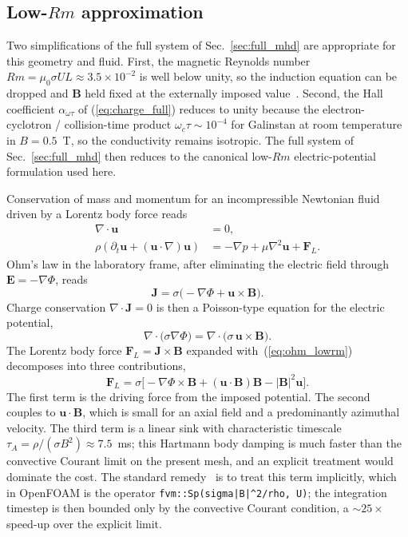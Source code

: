 \documentclass[aps,prl,twocolumn,superscriptaddress]{revtex4-2}
\begin{document}
\subsection{Low-$Rm$ approximation}
\label{sec:lowrm}

Two simplifications of the full system of
Sec.~\ref{sec:full_mhd} are appropriate for this geometry and fluid.
First, the magnetic Reynolds number $Rm = \mu_0\sigma U L \approx
3.5\!\times\!10^{-2}$ is well below unity, so the induction equation
can be dropped and $\mathbf{B}$ held fixed at the externally imposed
value~\cite{1,2}.  Second, the Hall coefficient $\alpha_{\omega\tau}$
of (\ref{eq:charge_full}) reduces to unity because the
electron-cyclotron / collision-time product $\omega_c\tau \sim
10^{-4}$ for Galinstan at room temperature in $B = 0.5$~T, so the
conductivity remains isotropic.  The full system of
Sec.~\ref{sec:full_mhd} then reduces to the canonical low-$Rm$
electric-potential formulation used here.

Conservation of mass and momentum for an incompressible Newtonian
fluid driven by a Lorentz body force reads
\begin{align}
\nabla\!\cdot\!\mathbf{u} &= 0, \label{eq:cont}\\
\rho\!\left(\partial_t\mathbf{u} + (\mathbf{u}\!\cdot\!\nabla)\mathbf{u}\right)
&= -\nabla p + \mu\nabla^{2}\mathbf{u} + \mathbf{F}_{L}.
\label{eq:nseom}
\end{align}
Ohm's law in the laboratory frame, after eliminating
the electric field through $\mathbf{E} = -\nabla\Phi$, reads
\begin{equation}
\mathbf{J} = \sigma\bigl(-\nabla\Phi + \mathbf{u}\!\times\!\mathbf{B}\bigr).
\label{eq:ohm_lowrm}
\end{equation}
Charge conservation $\nabla\!\cdot\!\mathbf{J} = 0$ is then a
Poisson-type equation for the electric potential,
\begin{equation}
\nabla\!\cdot\!\bigl(\sigma\nabla\Phi\bigr)
   = \nabla\!\cdot\!\bigl(\sigma\,\mathbf{u}\!\times\!\mathbf{B}\bigr).
\label{eq:phi_poisson}
\end{equation}
The Lorentz body force $\mathbf{F}_L = \mathbf{J}\!\times\!\mathbf{B}$
expanded with~(\ref{eq:ohm_lowrm}) decomposes into three contributions,
\begin{equation}
\mathbf{F}_L = \sigma\bigl[
   -\nabla\Phi\!\times\!\mathbf{B}
   + (\mathbf{u}\!\cdot\!\mathbf{B})\mathbf{B}
   - |\mathbf{B}|^{2}\mathbf{u}\bigr].
\label{eq:lorentz_decomp}
\end{equation}
The first term is the driving force from the imposed potential.  The
second couples to $\mathbf{u}\!\cdot\!\mathbf{B}$, which is small for
an axial field and a predominantly azimuthal velocity.  The third
term is a linear sink with characteristic timescale
$\tau_A = \rho/(\sigma B^{2}) \approx 7.5$~ms; this Hartmann body
damping is much faster than the convective Courant limit on the
present mesh, and an explicit treatment would dominate the cost.  The
standard remedy~\cite{2} is to treat this term implicitly, which in
OpenFOAM is the operator \texttt{fvm::Sp(sigma|B|\^{}2/rho, U)};
the integration timestep is then bounded only by the convective
Courant condition, a $\sim\!25\!\times$ speed-up over the explicit
limit.
\end{document}
